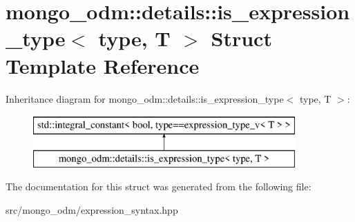\hypertarget{structmongo__odm_1_1details_1_1is__expression__type}{}\section{mongo\+\_\+odm\+:\+:details\+:\+:is\+\_\+expression\+\_\+type$<$ type, T $>$ Struct Template Reference}
\label{structmongo__odm_1_1details_1_1is__expression__type}
Inheritance diagram for mongo\+\_\+odm\+:\+:details\+:\+:is\+\_\+expression\+\_\+type$<$ type, T $>$\+:\begin{figure}[H]
\begin{center}
\leavevmode
\includegraphics[height=2.000000cm]{structmongo__odm_1_1details_1_1is__expression__type}
\end{center}
\end{figure}


The documentation for this struct was generated from the following file\+:\begin{DoxyCompactItemize}
\item 
src/mongo\+\_\+odm/expression\+\_\+syntax.\+hpp\end{DoxyCompactItemize}
